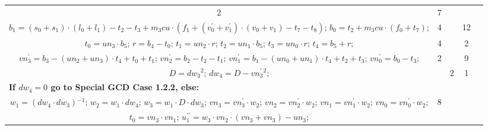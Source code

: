\begin{tabular}{|c|cr|c|c|c|c|}
{} & 2 &  & 7 & \\
\multicolumn{3}{|R{340pt}|}{ 
$b_1=(s_0+s_1) \cdot (l_0+l_1)-t_2-t_3+m_3cu \cdot (f_1+(v^{\prime}_0+v^{\prime}_1) \cdot (v_0+v_1)-t_7-t_8)$;\hspace{4pt}
$b_0=t_2+m_3cu \cdot (f_0+t_7)$;\hspace{4pt}
} & 4 &  & 12 & \\
\multicolumn{3}{|R{340pt}|}{ 
$t_0=un_3 \cdot b_5$;\hspace{4pt}
$r=b_4-t_0$;\hspace{4pt}
$t_1=un_2 \cdot r$;\hspace{4pt}
$t_2=un_1 \cdot b_5$;\hspace{4pt}
$t_3=un_0 \cdot r$;\hspace{4pt}
$t_4=b_5+r$;\hspace{4pt}
} & 4 &  & 2 & \\
\multicolumn{3}{|R{340pt}|}{ 
$vn^{\prime}_3=b_3-(un_2+un_3) \cdot t_4+t_0+t_1$;\hspace{4pt}
$vn^{\prime}_2=b_2-t_2-t_1$;\hspace{4pt}
$vn^{\prime}_1=b_1-(un_0+un_1) \cdot t_4+t_2+t_3$;\hspace{4pt}
$vn^{\prime}_0=b_0-t_3$;\hspace{4pt}
} & 2 &  & 9 & \\
\multicolumn{3}{|R{340pt}|}{ 
$D=dw_3{}^{2}$;\hspace{4pt}
$dw_4=D-vn^{\prime}_3{}^{2}$;\hspace{4pt}
} &  & 2 & 1 & \\
\multicolumn{3}{|l|}{ 
 \bf{If $dw_4 = 0$ go to Special GCD Case 1.2.2, else:} } &  &  &  & \\
\multicolumn{3}{|R{340pt}|}{ 
$w_1=(dw_4 \cdot dw_3){}^{-1}$;\hspace{4pt}
$w_2=w_1 \cdot dw_4$;\hspace{4pt}
$w_3=w_1 \cdot D \cdot dw_3$;\hspace{4pt}
$vn_3=vn^{\prime}_3 \cdot w_2$;\hspace{4pt}
$vn_2=vn^{\prime}_2 \cdot w_2$;\hspace{4pt}
$vn_1=vn^{\prime}_1 \cdot w_2$;\hspace{4pt}
$vn_0=vn^{\prime}_0 \cdot w_2$;\hspace{4pt}
} & 8 &  &  & \\
\multicolumn{3}{|R{340pt}|}{ 
$t_0=vn_3 \cdot vn_1$;\hspace{4pt}
$u^{\prime\prime}_1=w_3 \cdot vn_2 \cdot (vn_3+vn_3)-un_3$;\hspace{4pt}
}
\end{tabular}
